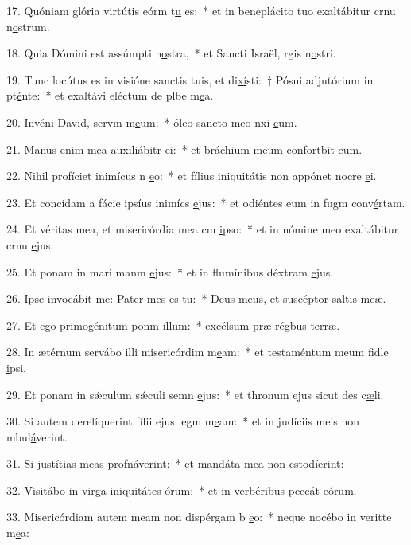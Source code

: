 17. Quóniam glória virtútis eórm t\uline{u} es:~* et in beneplácito tuo exaltábitur crnu n\uline{o}strum.\par 
18. Quia Dómini est assúmpti n\uline{o}stra,~* et Sancti Israël, rgis n\uline{o}stri.\par 
19. Tunc locútus es in visióne sanctis tuis, et di\uline{xí}sti:~† Pósui adjutórium in pt\uline{é}nte:~* et exaltávi eléctum de plbe m\uline{e}a.\par 
20. Invéni David, servm m\uline{e}um:~* óleo sancto meo nxi \uline{e}um.\par 
21. Manus enim mea auxiliábitr \uline{e}i:~* et bráchium meum confortbit \uline{e}um.\par 
22. Nihil profíciet inimícus n \uline{e}o:~* et fílius iniquitátis non appónet nocre \uline{e}i.\par 
23. Et concídam a fácie ipsíus inimícs \uline{e}jus:~* et odiéntes eum in fugm conv\uline{é}rtam.\par 
24. Et véritas mea, et misericórdia mea cm \uline{i}pso:~* et in nómine meo exaltábitur crnu \uline{e}jus.\par 
25. Et ponam in mari manm \uline{e}jus:~* et in flumínibus déxtram \uline{e}jus.\par 
26. Ipse invocábit me: Pater mes \uline{e}s tu:~* Deus meus, et suscéptor saltis m\uline{e}æ.\par 
27. Et ego primogénitum ponm \uline{i}llum:~* excélsum præ régbus t\uline{e}rræ.\par 
28. In ætérnum servábo illi misericórdim m\uline{e}am:~* et testaméntum meum fidle \uline{i}psi.\par 
29. Et ponam in sǽculum sǽculi semn \uline{e}jus:~* et thronum ejus sicut des c\uline{æ}li.\par 
30. Si autem derelíquerint fílii ejus legm m\uline{e}am:~* et in judíciis meis non mbul\uline{á}verint.\par 
31. Si justítias meas profn\uline{á}verint:~* et mandáta mea non cstod\uline{í}erint:\par 
32. Visitábo in virga iniquitátes \uline{ó}rum:~* et in verbéribus peccát e\uline{ó}rum.\par 
33. Misericórdiam autem meam non dispérgam b \uline{e}o:~* neque nocébo in veritte m\uline{e}a:\par 
